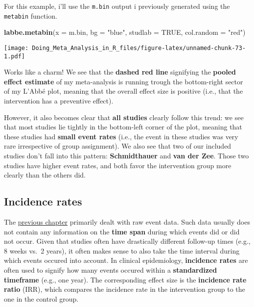 \documentclass[]{book}
\newenvironment{Shaded}{\begin{snugshade}}{\end{snugshade}}
\newcommand{\KeywordTok}[1]{\textcolor[rgb]{0.13,0.29,0.53}{\textbf{#1}}}
\newcommand{\DataTypeTok}[1]{\textcolor[rgb]{0.13,0.29,0.53}{#1}}
\newcommand{\StringTok}[1]{\textcolor[rgb]{0.31,0.60,0.02}{#1}}
\newcommand{\OtherTok}[1]{\textcolor[rgb]{0.56,0.35,0.01}{#1}}
\newcommand{\NormalTok}[1]{#1}
\theoremstyle{definition}
\theoremstyle{definition}
\theoremstyle{definition}
\theoremstyle{remark}
\begin{document}
For this example, i'll use the \texttt{m.bin} output i previously
generated using the \texttt{metabin} function.

\begin{Shaded}
\begin{Highlighting}[]
\KeywordTok{labbe.metabin}\NormalTok{(}\DataTypeTok{x =}\NormalTok{ m.bin,}
              \DataTypeTok{bg =} \StringTok{"blue"}\NormalTok{,}
              \DataTypeTok{studlab =} \OtherTok{TRUE}\NormalTok{,}
              \DataTypeTok{col.random =} \StringTok{"red"}\NormalTok{)}
\end{Highlighting}
\end{Shaded}

\texttt{[image: Doing\_Meta\_Analysis\_in\_R\_files/figure-latex/unnamed-chunk-73-1.pdf]}

Works like a charm! We see that the \textbf{dashed red line} signifying
the \textbf{pooled effect estimate} of my meta-analysis is running
trough the bottom-right sector of my L'Abbé plot, meaning that the
overall effect size is positive (i.e., that the intervention has a
preventive effect).

However, it also becomes clear that \textbf{all studies} clearly follow
this trend: we see that most studies lie tightly in the bottom-left
corner of the plot, meaning that these studies had \textbf{small event
rates} (i.e., the event in these studies was very rare irrespective of
group assignment). We also see that two of our included studies don't
fall into this pattern: \textbf{Schmidthauer} and \textbf{van der Zee}.
Those two studies have higher event rates, and both favor the
intervention group more clearly than the others did.

\subsection{Incidence rates}\label{incidence-rates}

The \protect\hyperlink{binary}{previous chapter} primarily dealt with
raw event data. Such data usually does not contain any information on
the \textbf{time span} during which events did or did not occur. Given
that studies often have drastically different follow-up times (e.g., 8
weeks vs.~2 years), it often makes sense to also take the time interval
during which events occured into account. In clinical epidemiology,
\textbf{incidence rates} are often used to signify how many events
occured within a \textbf{standardized timeframe} (e.g., one year). The
corresponding effect size is the \textbf{incidence rate ratio} (IRR),
which compares the incidence rate in the intervention group to the one
in the control group.
\end{document}
